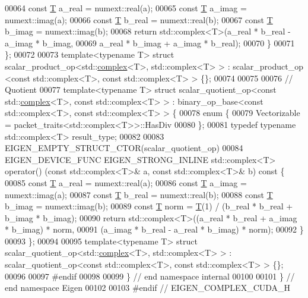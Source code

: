 \begin{DoxyCode}
00064     \textcolor{keyword}{const} \hyperlink{group___sparse_core___module_class_eigen_1_1_triplet}{T} a\_real = numext::real(a);
00065     \textcolor{keyword}{const} \hyperlink{group___sparse_core___module_class_eigen_1_1_triplet}{T} a\_imag = numext::imag(a);
00066     \textcolor{keyword}{const} \hyperlink{group___sparse_core___module_class_eigen_1_1_triplet}{T} b\_real = numext::real(b);
00067     \textcolor{keyword}{const} \hyperlink{group___sparse_core___module_class_eigen_1_1_triplet}{T} b\_imag = numext::imag(b);
00068     \textcolor{keywordflow}{return} std::complex<T>(a\_real * b\_real - a\_imag * b\_imag,
00069                            a\_real * b\_imag + a\_imag * b\_real);
00070   \}
00071 \};
00072 
00073 \textcolor{keyword}{template}<\textcolor{keyword}{typename} T> \textcolor{keyword}{struct }scalar\_product\_op<std::\hyperlink{structcomplex}{complex}<T>, std::complex<T> > : scalar\_product\_op
      <const std::complex<T>, const std::complex<T> > \{\};
00074 
00075 
00076 \textcolor{comment}{// Quotient}
00077 \textcolor{keyword}{template}<\textcolor{keyword}{typename} T> \textcolor{keyword}{struct }scalar\_quotient\_op<const std::\hyperlink{structcomplex}{complex}<T>, const std::complex<T> > : 
      binary\_op\_base<const std::complex<T>, const std::complex<T> > \{
00078   \textcolor{keyword}{enum} \{
00079     Vectorizable = packet\_traits<std::complex<T>>::HasDiv
00080   \};
00081   \textcolor{keyword}{typedef} \textcolor{keyword}{typename} std::complex<T> result\_type;
00082 
00083   EIGEN\_EMPTY\_STRUCT\_CTOR(scalar\_quotient\_op)
00084   EIGEN\_DEVICE\_FUNC EIGEN\_STRONG\_INLINE std::complex<T> operator() (\textcolor{keyword}{const} std::complex<T>& a, \textcolor{keyword}{const} 
      std::complex<T>& b)\textcolor{keyword}{ const }\{
00085     \textcolor{keyword}{const} \hyperlink{group___sparse_core___module_class_eigen_1_1_triplet}{T} a\_real = numext::real(a);
00086     \textcolor{keyword}{const} \hyperlink{group___sparse_core___module_class_eigen_1_1_triplet}{T} a\_imag = numext::imag(a);
00087     \textcolor{keyword}{const} \hyperlink{group___sparse_core___module_class_eigen_1_1_triplet}{T} b\_real = numext::real(b);
00088     \textcolor{keyword}{const} \hyperlink{group___sparse_core___module_class_eigen_1_1_triplet}{T} b\_imag = numext::imag(b);
00089     \textcolor{keyword}{const} \hyperlink{group___sparse_core___module_class_eigen_1_1_triplet}{T} norm = \hyperlink{group___sparse_core___module_class_eigen_1_1_triplet}{T}(1) / (b\_real * b\_real + b\_imag * b\_imag);
00090     \textcolor{keywordflow}{return} std::complex<T>((a\_real * b\_real + a\_imag * b\_imag) * norm,
00091                            (a\_imag * b\_real - a\_real * b\_imag) * norm);
00092   \}
00093 \};
00094 
00095 \textcolor{keyword}{template}<\textcolor{keyword}{typename} T> \textcolor{keyword}{struct }scalar\_quotient\_op<std::\hyperlink{structcomplex}{complex}<T>, std::complex<T> > : 
      scalar\_quotient\_op<const std::complex<T>, const std::complex<T> > \{\};
00096 
00097 \textcolor{preprocessor}{#endif}
00098 
00099 \} \textcolor{comment}{// end namespace internal}
00100 
00101 \} \textcolor{comment}{// end namespace Eigen}
00102 
00103 \textcolor{preprocessor}{#endif // EIGEN\_COMPLEX\_CUDA\_H}
\end{DoxyCode}
